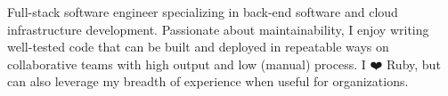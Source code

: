 

\begin{cvparagraph}

Full-stack software engineer specializing in back-end software and cloud
  infrastructure development.  Passionate about maintainability, I enjoy writing
  well-tested code that can be built and deployed in repeatable ways on
  collaborative teams with high output and low (manual) process. I
  \textcolor{awesome}{❤️} Ruby, but can also leverage my breadth of experience
  when useful for organizations.
\end{cvparagraph}
